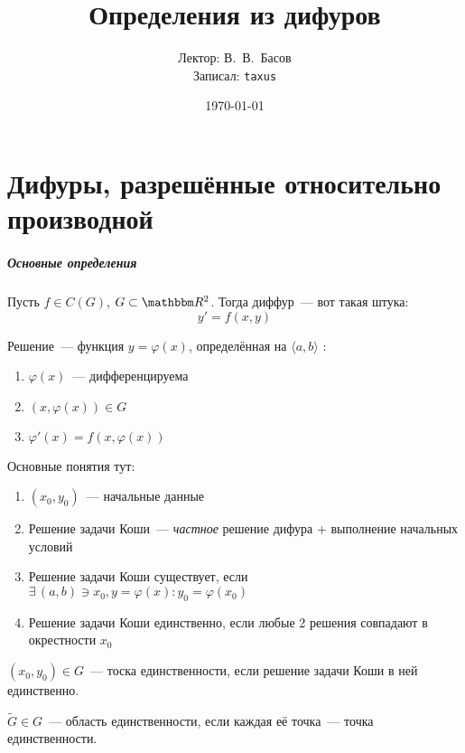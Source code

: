\documentclass[10pt, timbord]{../notes}
\title{Определения из дифуров}
\date{\today}
\author{Лектор: В.~В.~Басов \\
        Записал: \texttt{taxus}}
\begin{document}
\maketitle

\chapter{Дифуры, разрешённые относительно производной}

\paragraph{Основные определения}

\begin{defn}\label{defn:diffeq}
  Пусть $f \in C(G)$, $G \subset \R^2$. Тогда диффур~--- вот такая штука:
  \[
    y' = f(x, y)
  \]
\end{defn}
\begin{defn}\label{defn:diffsol}
  Решение~--- функция $y=\varphi(x)$, определённая на $\langle a, b \rangle$ :
  \begin{enumerate}
    \item $\varphi(x)$~--- дифференцируема
    \item $(x, \varphi(x)) \in G$
    \item $\varphi'(x) = f(x, \varphi(x))$
  \end{enumerate}
\end{defn}

\begin{defn}\label{defn:cauchyprobl} 
  Основные понятия тут:
  \begin{enumerate}
    \item $(x_0, y_0)$~--- начальные данные
  \item Решение задачи Коши~--- \emph{частное} решение дифура + выполнение начальных условий
    \item Решение задачи Коши существует, если $\exists\, (a,b) \ni x_0,
      y=\varphi(x)\colon y_0 = \varphi(x_0)$
    \item Решение задачи Коши единственно, если любые 2 решения совпадают в окрестности
      $x_0$ 
  \end{enumerate}
\end{defn}

\begin{defn}\label{defn:uniqpnt}
  $(x_0, y_0) \in G$~--- тоска единственности, если решение задачи Коши в ней единственно.
\end{defn}
\begin{defn}\label{defn:uniqset}
  $\widetilde{G} \in G$~--- область единственности, если каждая её точка~--- точка
  единственности.
\end{defn}
\end{document}
